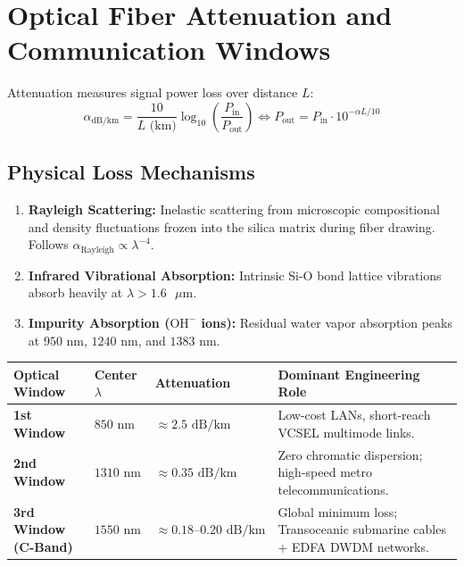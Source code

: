 \section{Optical Fiber Attenuation and Communication Windows}
Attenuation measures signal power loss over distance $L$:
\begin{equation}
\alpha_{\text{dB/km}} = \frac{10}{L\text{ (km)}} \log_{10}\left(\frac{P_{\text{in}}}{P_{\text{out}}}\right) \iff P_{\text{out}} = P_{\text{in}} \cdot 10^{-\alpha L / 10}
\end{equation}
\subsection{Physical Loss Mechanisms}
\begin{enumerate}[itemsep=2pt]
    \item \textbf{Rayleigh Scattering:} Inelastic scattering from microscopic compositional and density fluctuations frozen into the silica matrix during fiber drawing. Follows $\alpha_{\text{Rayleigh}} \propto \lambda^{-4}$.
    \item \textbf{Infrared Vibrational Absorption:} Intrinsic $\text{Si-O}$ bond lattice vibrations absorb heavily at $\lambda > 1.6\text{ }\mu\text{m}$.
    \item \textbf{Impurity Absorption ($\text{OH}^-$ ions):} Residual water vapor absorption peaks at $950\text{ nm}$, $1240\text{ nm}$, and $1383\text{ nm}$.
\end{enumerate}

\begin{center}
\begin{tabularx}{\textwidth}{l l l X}
\toprule
\textbf{Optical Window} & \textbf{Center $\lambda$} & \textbf{Attenuation} & \textbf{Dominant Engineering Role} \\
\midrule
\textbf{1st Window} & $850\text{ nm}$ & $\approx 2.5\text{ dB/km}$ & Low-cost LANs, short-reach VCSEL multimode links. \\
\textbf{2nd Window} & $1310\text{ nm}$ & $\approx 0.35\text{ dB/km}$ & Zero chromatic dispersion; high-speed metro telecommunications. \\
\textbf{3rd Window (C-Band)} & $1550\text{ nm}$ & $\approx 0.18\text{--}0.20\text{ dB/km}$ & Global minimum loss; Transoceanic submarine cables + EDFA DWDM networks. \\
\bottomrule
\end{tabularx}
\end{center}

